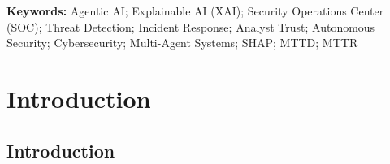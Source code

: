 \documentclass[12pt,a4paper]{report}
\begin{document}
\begin{abstract}
The increasing number and complexity of cyber assaults is placing growing pressure on Security Operations Centers (SOCs), resulting in alert fatigue, slow response times and a shortage of skilled analysts. Agentic Artificial Intelligence (Agentic AI) offers a promising solution for autonomous threat detection and response, but the ``black-box'' nature of such systems reduces analyst trust and limits adoption. The research aims to design, implement and evaluate a new Explainable Agentic AI Framework that integrates autonomous AI agents with Explainable AI (XAI) mechanisms. The framework will enhance threat detection, enhance incident response metrics (MTTD/MTTR), and, importantly, build analyst trust via transparent, human-understandable explanations. We will evaluate the framework against traditional and AI-based SOC approaches through a quantitative experimental methodology, using public cybersecurity datasets (CICIDS2017, UNSW-NB15) and a simulated SOC environment.
\end{abstract}

\vspace{0.3cm}
\noindent\textbf{Keywords:} Agentic AI; Explainable AI (XAI); Security Operations Center (SOC); Threat Detection; Incident Response; Analyst Trust; Autonomous Security; Cybersecurity; Multi-Agent Systems; SHAP; MTTD; MTTR

\newpage

\tableofcontents
\listoftables

\newpage

\chapter{Introduction}
\label{ch:introduction}

\section{Introduction}
\label{sec:intro}
\end{document}
